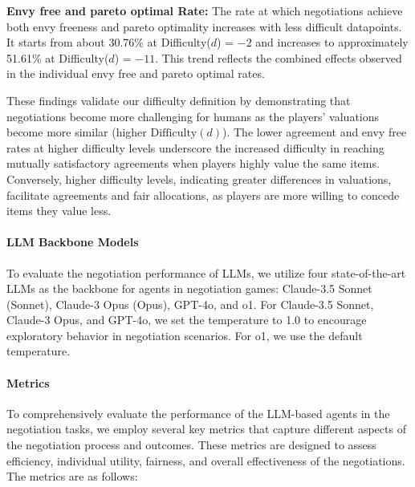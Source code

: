 \textbf{Envy free and pareto optimal Rate:} The rate at which negotiations achieve both envy freeness and pareto optimality increases with less difficult datapoints. It starts from about 30.76\% at Difficulty($d$) = $-2$ and increases to approximately 51.61\% at Difficulty($d$) = $-11$. This trend reflects the combined effects observed in the individual envy free and pareto optimal rates.

These findings validate our difficulty definition by demonstrating that negotiations become more challenging for humans as the players' valuations become more similar (higher $\text{Difficulty}(d)$). The lower agreement and envy free rates at higher difficulty levels underscore the increased difficulty in reaching mutually satisfactory agreements when players highly value the same items. Conversely, higher difficulty levels, indicating greater differences in valuations, facilitate agreements and fair allocations, as players are more willing to concede items they value less.

\paragraph{LLM Backbone Models}
To evaluate the negotiation performance of LLMs, we utilize four state-of-the-art LLMs as the backbone for agents in negotiation games: Claude-3.5 Sonnet (Sonnet), Claude-3 Opus (Opus), GPT-4o, and o1. For Claude-3.5 Sonnet, Claude-3 Opus, and GPT-4o, we set the temperature to 1.0 to encourage exploratory behavior in negotiation scenarios. For o1, we use the default temperature.

\paragraph{Metrics}
To comprehensively evaluate the performance of the LLM-based agents in the negotiation tasks, we employ several key metrics that capture different aspects of the negotiation process and outcomes. These metrics are designed to assess efficiency, individual utility, fairness, and overall effectiveness of the negotiations. The metrics are as follows:

